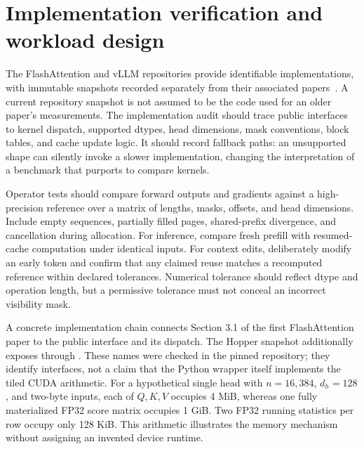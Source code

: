 \section{Implementation verification and workload design}
\label{sec:C04:implementation}
The FlashAttention and vLLM repositories provide identifiable implementations, with immutable snapshots recorded separately from their associated papers~\cite{repo_flashattention,repo_vllm}. A current repository snapshot is not assumed to be the code used for an older paper's measurements. The implementation audit should trace public interfaces to kernel dispatch, supported dtypes, head dimensions, mask conventions, block tables, and cache update logic. It should record fallback paths: an unsupported shape can silently invoke a slower implementation, changing the interpretation of a benchmark that purports to compare kernels.

Operator tests should compare forward outputs and gradients against a high-precision reference over a matrix of lengths, masks, offsets, and head dimensions. Include empty sequences, partially filled pages, shared-prefix divergence, and cancellation during allocation. For inference, compare fresh prefill with resumed-cache computation under identical inputs. For context edits, deliberately modify an early token and confirm that any claimed reuse matches a recomputed reference within declared tolerances. Numerical tolerance should reflect dtype and operation length, but a permissive tolerance must not conceal an incorrect visibility mask.

A concrete implementation chain connects Section 3.1 of the first FlashAttention paper to the public  interface and its  dispatch. The Hopper snapshot additionally exposes  through . These names were checked in the pinned repository; they identify interfaces, not a claim that the Python wrapper itself implements the tiled CUDA arithmetic. For a hypothetical single head with $n=16{,}384$, $d_h=128$, and two-byte inputs, each of $Q,K,V$ occupies 4 MiB, whereas one fully materialized FP32 score matrix occupies 1 GiB. Two FP32 running statistics per row occupy only 128 KiB. This arithmetic illustrates the memory mechanism without assigning an invented device runtime.


